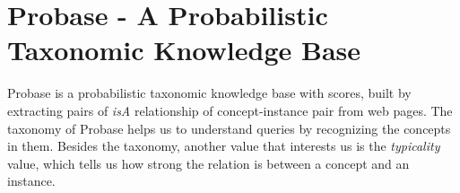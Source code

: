 \section{Probase - A Probabilistic Taxonomic Knowledge Base}\label{sec:probase}
Probase \cite{wu2012probase} is a probabilistic taxonomic knowledge base with scores, built by
extracting pairs of \textit{isA} relationship of concept-instance pair
from web pages. The taxonomy of Probase helps us to understand queries by recognizing the concepts in them. 
Besides the taxonomy, another value that interests us is
the \textit{typicality} value, which tells us how strong the relation is
between a concept and an instance. 

